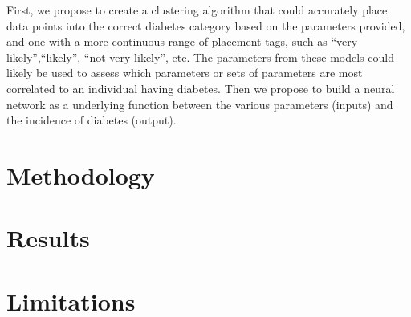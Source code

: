 \documentclass[letterpaper,12pt,onecolumn]{article}
\begin{document}
First, we propose to create a clustering algorithm that could accurately place data points into the correct diabetes category based on the parameters provided, and one with a more continuous range of placement tags, such as ``very likely'',``likely'', ``not very likely'', etc.  The parameters from these models could likely be used to assess which parameters or sets of parameters are most correlated to an individual having diabetes. Then we propose to build a neural network as a underlying function between the various parameters (inputs) and the incidence of diabetes (output).   









\section{Methodology}





\section{Results}


\section{Limitations}


\end{document}
